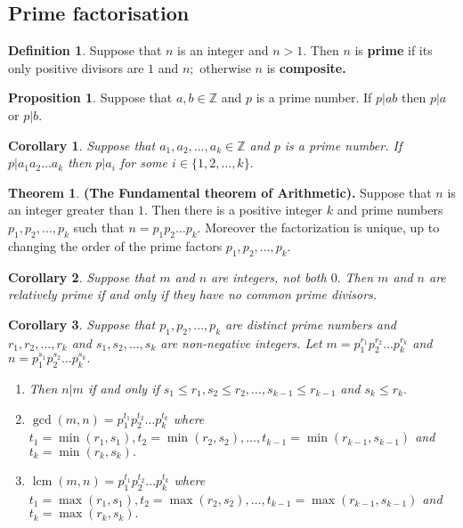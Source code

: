 \documentclass[12pt, a4paper]{article}
\newcommand{\bb}[1]{\mathbb{#1}}
\DeclareMathOperator{\lcm}{lcm}
\theoremstyle{definition}
\newtheorem{definition}{Definition}[section]
\newtheorem{theorem}{Theorem}[section]
\newtheorem{proposition}{Proposition}
\theoremstyle{plain}
\newtheorem{corollary}{Corollary}[theorem]
\begin{document}
\subsection{Prime factorisation}

\begin{definition}
Suppose that $n$ is an integer and $n > 1.$ Then $n$ is \textbf{prime} if its only positive divisors are $1$ and $n;$ otherwise $n$ is \textbf{composite.}
\end{definition}

\begin{proposition}
Suppose that $a, b \in \bb{Z}$ and $p$ is a prime number. If $p|ab$ then $p|a$ or $p|b.$
\end{proposition}

\begin{corollary}
Suppose that $a_1, a_2, \ldots, a_k \in \bb{Z}$ and $p$ is a prime number. If $p|a_1a_2\ldots a_k$ then $p|a_i$ for some $i \in \{1,2,\ldots,k\}.$
\end{corollary}

\begin{theorem}\textbf{(The Fundamental theorem of Arithmetic).} Suppose that $n$ is an integer greater than $1.$ Then there is a positive integer $k$ and prime numbers $p_1,p_2,\ldots,p_k$ such that $n = p_1p_2\ldots p_k.$ Moreover the factorization is unique, up to changing the order of the prime factors $p_1,p_2,\ldots,p_k$.
\end{theorem}

\begin{corollary}
Suppose that $m$ and $n$ are integers, not both $0.$ Then $m$ and $n$ are relatively prime if and only if they have no common prime divisors.
\end{corollary}

\begin{corollary}
Suppose that $p_1, p_2,\ldots, p_k$ are distinct prime numbers and $r_1,r_2 ,\ldots,r_k$ and $s_1,s_2 ,\ldots,s_k$ are non-negative integers. Let $m = p_1^{r_1}p_2^{r_2}\ldots p_k^{r_k}$ and $n = p_1^{s_1}p_2^{s_2}\ldots p_k^{s_k}.$
\begin{enumerate}
	
	\item Then $n|m$ if and only if $s_1 \leq r_1,s_2 \leq r_2,\ldots,s_{k-1} \leq r_{k-1}$ and $s_k \leq r_k.$

	\item $\gcd(m,n) = p_1^{t_1}p_2^{t_2}\ldots p_k^{t_k}$ where $t_1=\min(r_1,s_1), t_2=\min(r_2,s_2),\ldots,t_{k-1}=\min(r_{k-1},s_{k-1})$ and $t_k=\min(r_k,s_k).$

	\item $\lcm(m,n)=p_1^{t_1}p_2^{t_2}\ldots p_k^{t_k}$ where $t_1=\max(r_1,s_1), t_2=\max(r_2,s_2),\ldots,t_{k-1}=\max(r_{k-1},s_{k-1})$ and $t_k=\max(r_k,s_k).$

\end{enumerate}
\end{corollary}
\end{document}
